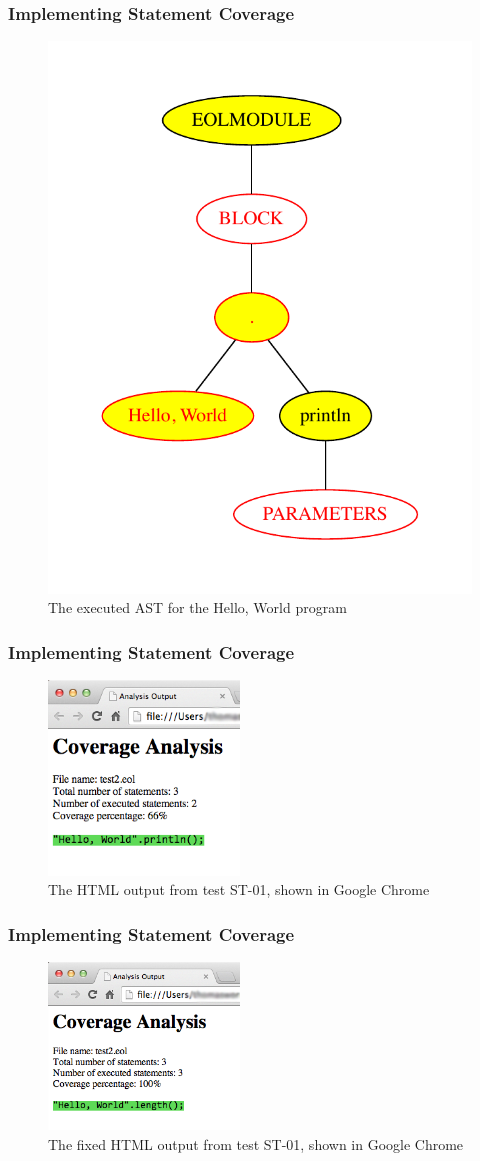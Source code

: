 \begin{frame}
\frametitle{Implementing Statement Coverage}
\begin{figure}
  \centering
  \includegraphics[width=0.4\linewidth]{figures/ST01AST.pdf}
  \caption{The executed AST for the Hello, World program}
\end{figure}
\end{frame}

\begin{frame}
\frametitle{Implementing Statement Coverage}
\begin{figure}
  \centering
  \includegraphics[width=2in]{figures/ST01HTML.png}
  \caption{The HTML output from test ST-01, shown in Google Chrome}
  \label{fig:ST01HTML}
\end{figure}
\end{frame}

\begin{frame}
\frametitle{Implementing Statement Coverage}
\begin{figure}
  \centering
  \includegraphics[width=2in]{figures/ST01HTML_fixed.png}
  \caption{The fixed HTML output from test ST-01, shown in Google Chrome}
  \label{fig:ST01HTML}
\end{figure}
\end{frame}